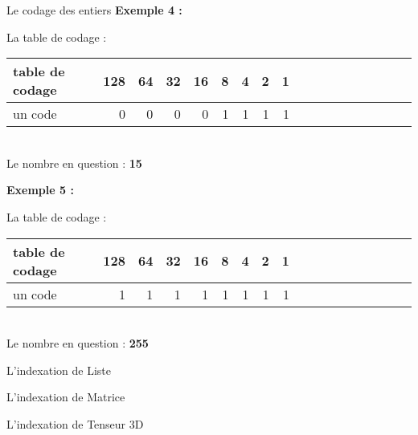 \begin{frame}{Le codage des entiers}
    \textbf{Exemple 4 :}
    \begin{center}
        La table de codage : \\
        $\;$\\
        \begin{tabular}{|*{2}{l||r|r|r|r|r|r|r|r|}}
            \hline
                table de codage & 128 & 64 & 32 & 16 & 8 & 4 & 2 & 1 \\
            \hline
                un code         & 0   & 0  & 0  & 0  & 1 & 1 & 1 & 1 \\
            \hline
        \end{tabular} \\
        $\;$\\
        Le nombre en question : \textbf{15} \\
    \end{center}
    \textbf{Exemple 5 :}
    \begin{center}
        La table de codage : \\
        $\;$\\
        \begin{tabular}{|*{2}{l||r|r|r|r|r|r|r|r|}}
            \hline
                table de codage & 128 & 64 & 32 & 16 & 8 & 4 & 2 & 1 \\
            \hline
                un code         & 1   & 1  & 1  & 1  & 1 & 1 & 1 & 1 \\
            \hline
        \end{tabular} \\
        $\;$\\
        Le nombre en question : \textbf{255} \\
    \end{center}
\end{frame}

\begin{frame}{L'indexation de Liste}
\end{frame}

\begin{frame}{L'indexation de Matrice}
\end{frame}

\begin{frame}{L'indexation de Tenseur 3D}
\end{frame}
